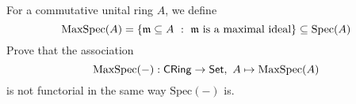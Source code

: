 \vspace{0.1in}

\begin{problem}\label{prob 2.12}
For a commutative unital ring $A$, we define 
\[\mathrm{MaxSpec}(A) = \left\{\mathfrak{m}\subseteq A\ :\ \mathfrak{m} \text{ is a maximal ideal}\right\} \subseteq \mathrm{Spec}(A)\]
Prove that the association
\[\mathrm{MaxSpec}(-): \mathsf{CRing} \to \mathsf{Set},\ A \mapsto \mathrm{MaxSpec}(A)\]
is not functorial in the same way $\mathrm{Spec}(-)$ is.
\end{problem}

\vspace*{0.2in}

\printendnotes 